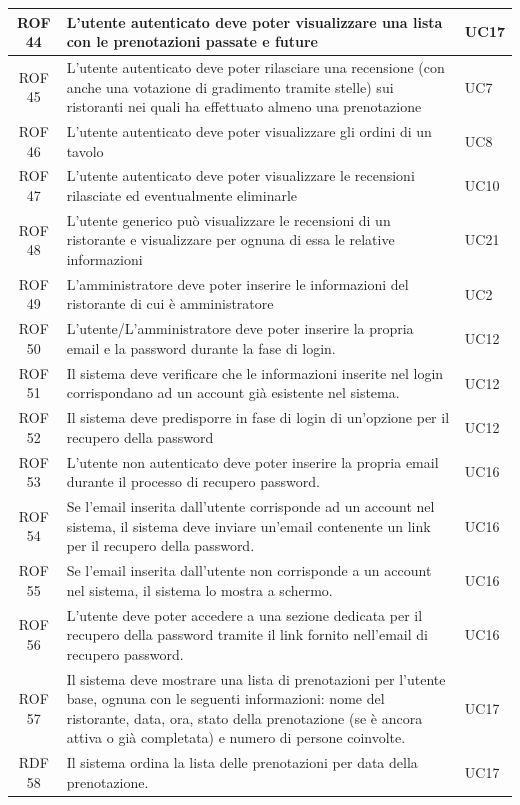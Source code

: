 \documentclass[12pt, oneside]{article}
\begin{document}
\begin{longtable}{|c|p{14cm}|p{2cm}|}
    \hline
    ROF 44& L'utente autenticato deve poter visualizzare una lista con le prenotazioni passate e future & UC17 \\
    \hline
    ROF 45& L'utente autenticato deve poter rilasciare una recensione (con anche una votazione di gradimento tramite stelle) sui ristoranti nei quali ha effettuato almeno una prenotazione & UC7 \\
    \hline
    ROF 46& L'utente autenticato deve poter visualizzare gli ordini di un tavolo & UC8 \\
    \hline
    ROF 47& L'utente autenticato deve poter visualizzare le recensioni rilasciate ed eventualmente eliminarle & UC10 \\
    \hline
    ROF 48& L'utente generico può visualizzare le recensioni di un ristorante e visualizzare per ognuna di essa le relative informazioni & UC21 \\
    \hline
    ROF 49& L'amministratore deve poter inserire le informazioni del ristorante di cui è amministratore & UC2 \\
    \hline
    ROF 50& L'utente/L'amministratore deve poter inserire la propria email e la password durante la fase di login.  & UC12 \\
    \hline
    ROF 51& Il sistema deve verificare che le informazioni inserite nel login corrispondano ad un account già esistente nel sistema.  & UC12 \\
    \hline
    ROF 52& Il sistema deve predisporre in fase di login di un'opzione per il recupero della password  & UC12 \\
    \hline
    ROF 53& L'utente non autenticato deve poter inserire la propria email durante il processo di recupero password.  & UC16 \\
    \hline
    ROF 54 & Se l'email inserita dall'utente corrisponde ad un account nel sistema, il sistema deve inviare un'email contenente un link per il recupero della password.  & UC16 \\
    \hline
    ROF 55 & Se l'email inserita dall'utente non corrisponde a un account nel sistema, il sistema lo mostra a schermo.  & UC16 \\
    \hline
    ROF 56 & L'utente deve poter accedere a una sezione dedicata per il recupero della password tramite il link fornito nell'email di recupero password.  & UC16 \\
    \hline
    ROF 57 & Il sistema deve mostrare una lista di prenotazioni per l'utente base, ognuna con le seguenti informazioni:
    nome del ristorante, data, ora, stato della prenotazione (se è ancora attiva o già completata) e numero di persone coinvolte. & UC17 \\
    \hline
    RDF 58 & Il sistema ordina la lista delle prenotazioni per data della prenotazione.  & UC17 \\
    \hline


\end{longtable}
\end{document}
